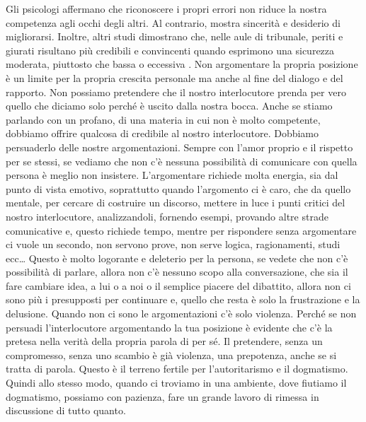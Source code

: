 \documentclass[12pt]{book} %
\begin{document}
Gli psicologi affermano che riconoscere i propri errori non riduce la nostra competenza agli occhi degli altri. Al contrario, mostra sincerità e desiderio di migliorarsi. Inoltre, altri studi dimostrano che, nelle aule di tribunale, periti e giurati risultano più credibili e convincenti quando esprimono una sicurezza moderata, piuttosto che bassa o eccessiva .
Non argomentare la propria posizione è un limite per la propria crescita personale ma anche al fine del
dialogo e del rapporto. Non possiamo pretendere che il nostro interlocutore prenda per vero quello che diciamo solo perché è uscito
dalla nostra bocca. Anche se stiamo parlando con un profano, di una materia in cui non è molto competente, dobbiamo
offrire qualcosa di credibile al nostro interlocutore. Dobbiamo persuaderlo delle nostre argomentazioni. Sempre con
l'amor proprio e il rispetto per se stessi, se vediamo che non c'è nessuna
possibilità di comunicare con quella persona è meglio non insistere. L'argomentare richiede molta
energia, sia dal punto di vista emotivo, soprattutto quando l'argomento ci è caro, che da quello
mentale, per cercare di costruire un discorso, mettere in luce i punti critici del nostro interlocutore, analizzandoli,
fornendo esempi, provando altre strade comunicative e, questo richiede tempo, mentre per rispondere senza argomentare ci vuole
un secondo, non servono prove, non serve logica, ragionamenti, studi ecc… Questo è molto logorante e deleterio per la
persona, se vedete che non c'è possibilità di parlare, allora non c'è nessuno
scopo alla conversazione, che sia il fare cambiare idea, a lui o a noi o il semplice piacere del dibattito, allora non ci sono più i
presupposti per continuare e, quello che resta è solo la frustrazione e la delusione. 
Quando non ci sono le argomentazioni c'è solo violenza. Perché se non persuadi
l'interlocutore argomentando la tua posizione è evidente che c'è la pretesa
nella verità della propria parola di per sé. Il pretendere, senza un compromesso, senza uno scambio è già violenza, una
prepotenza, anche se si tratta di parola. Questo è il terreno fertile per
l'autoritarismo e il dogmatismo. Quindi allo stesso modo, quando ci troviamo in una ambiente, dove
fiutiamo il dogmatismo, possiamo con pazienza, fare un grande lavoro di rimessa in discussione di tutto quanto. 
\end{document}
